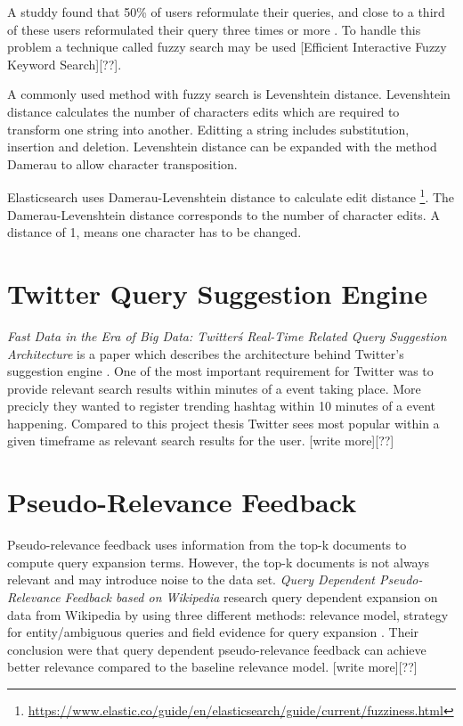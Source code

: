 A studdy found that 50\% of users reformulate their queries, and close to a third of these users reformulated their query three times or more \cite{query-reformulate}.
To handle this problem a technique called fuzzy search may be used [Efficient Interactive Fuzzy Keyword Search][??].

A commonly used method with fuzzy search is Levenshtein distance.
Levenshtein distance calculates the number of characters edits which are required to transform one string into another.
Editting a string includes substitution, insertion and deletion.
Levenshtein distance can be expanded with the method Damerau to allow character transposition.

Elasticsearch uses Damerau-Levenshtein distance to calculate edit distance \footnote{\url{https://www.elastic.co/guide/en/elasticsearch/guide/current/fuzziness.html}}.
The Damerau-Levenshtein distance corresponds to the number of character edits.
A distance of 1, means one character has to be changed.

\section{Twitter Query Suggestion Engine}
\textit{Fast Data in the Era of Big Data: Twitter\'s Real-Time Related Query Suggestion Architecture} is a paper which describes the architecture behind Twitter's suggestion engine \cite{twitter-suggestion}.
One of the most important requirement for Twitter was to provide relevant search results within minutes of a event taking place.
More precicly they wanted to register trending hashtag within 10 minutes of a event happening.
Compared to this project thesis Twitter sees most popular within a given timeframe as relevant search results for the user.
[write more][??]

\section{Pseudo-Relevance Feedback}
Pseudo-relevance feedback uses information from the top-k documents to compute query expansion terms.
However, the top-k documents is not always relevant and may introduce noise to the data set.
\textit{Query Dependent Pseudo-Relevance Feedback based on Wikipedia} research query dependent expansion on data from Wikipedia by using three different methods:
relevance model, strategy for entity/ambiguous queries and field evidence for query expansion \cite{pseudo-relevance-wikipedia}.
Their conclusion were that query dependent pseudo-relevance feedback can achieve better relevance compared to the baseline relevance model.
[write more][??]
